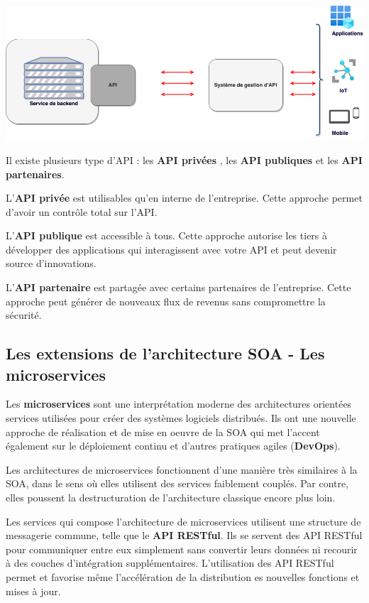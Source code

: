 \documentclass[
]{book}
\theoremstyle{definition}
\theoremstyle{definition}
\theoremstyle{definition}
\theoremstyle{definition}
\theoremstyle{remark}
\begin{document}
\begin{center}\includegraphics[width=0.7\linewidth]{api} \end{center}

Il existe plusieurs type d'API : les \textbf{API privées} , les \textbf{API publiques} et les \textbf{API partenaires}.

L'\textbf{API privée} est utilisables qu'en interne de l'entreprise. Cette approche permet d'avoir un contrôle total sur l'API.

L'\textbf{API publique} est accessible à tous. Cette approche autorise les tiers à développer des applications qui interagissent avec votre API et peut devenir source d'innovations.

L'\textbf{API partenaire} est partagée avec certains partenaires de l'entreprise. Cette approche peut générer de nouveaux flux de revenus sans compromettre la sécurité.

\hypertarget{les-extensions-de-larchitecture-soa---les-microservices}{%
\subsection{Les extensions de l'architecture SOA - Les microservices}\label{les-extensions-de-larchitecture-soa---les-microservices}}

Les \textbf{microservices} sont une interprétation moderne des architectures orientées services utilisées pour créer des systèmes logiciels distribués. Ils ont une nouvelle approche de réalisation et de mise en oeuvre de la SOA qui met l'accent également sur le déploiement continu et d'autres pratiques agiles (\textbf{DevOps}).

Les architectures de microservices fonctionnent d'une manière très similaires à la SOA, dans le sens où elles utilisent des services faiblement couplés. Par contre, elles poussent la destructuration de l'architecture classique encore plus loin.

Les services qui compose l'architecture de microservices utilisent une structure de messagerie commune, telle que le \textbf{API RESTful}. Ils se servent des API RESTful pour communiquer entre eux simplement sans convertir leurs données ni recourir à des couches d'intégration supplémentaires. L'utilisation des API RESTful permet et favorise même l'accélération de la distribution es nouvelles fonctions et mises à jour.
\end{document}

